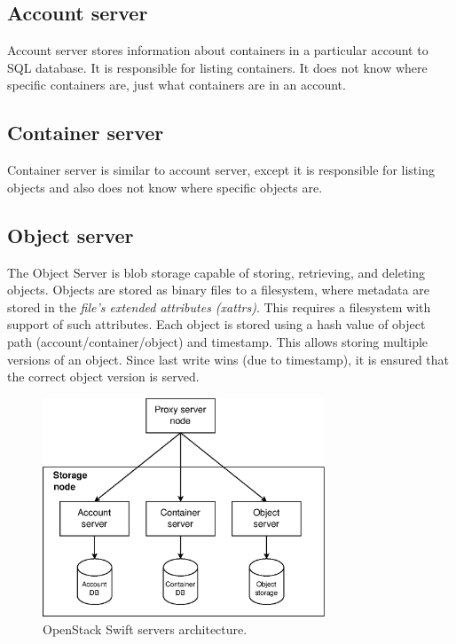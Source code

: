     \subsection{Account server}
    Account server stores information about containers in a particular account to SQL database. It is responsible for listing containers. It does not know where specific containers are, just what containers are in an account\cite{SwiftArchitecturalOverview}.

    \subsection{Container server}
    Container server is similar to account server, except it is responsible for listing objects and also does not know where specific objects are\cite{SwiftArchitecturalOverview}.

    \subsection{Object server}
    The Object Server is blob storage capable of storing, retrieving, and deleting objects. Objects are stored as binary files to a filesystem, where metadata are stored in the \textit{file's extended attributes (xattrs)}. This requires a filesystem with support of such attributes. Each object is stored using a hash value of object path (account/container/object) and timestamp. This allows storing multiple versions of an object. Since last write wins (due to timestamp), it is ensured that the correct object version is served\cite{SwiftArchitecturalOverview}.

    \begin{figure}[H]
        \centering
        \includegraphics[width=0.75\textwidth]{obrazky-figures/swift-servers.eps}
        \caption{OpenStack Swift servers architecture.}
        \label{fig:swiftServers}
    \end{figure}

